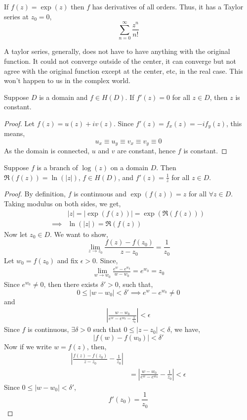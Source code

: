 \documentclass[12pt]{amsart}
\begin{document}
\begin{remark}
    If $f(z) = \exp(z)$ then $f$ has derivatives of all orders. Thus, it has a Taylor series at $z_0 = 0$, 
    \[ \sum_{n=0}^\infty \frac{z^n}{n!} \]
\end{remark}

\begin{remark}
    A taylor series, generally, does not have to have anything with the original function. It could not converge outside of the center, it can converge but not agree with the original function except at the center, etc, in the real case. This won't happen to us in the complex world. 
\end{remark}

\begin{proposition}
    Suppose $D$ is a domain and $f \in H(D)$. If $f'(z) = 0$ for all $z \in D$, then $z$ is constant. 
\end{proposition}
\begin{proof}
    Let $f(z) = u(z) + iv(z)$. Since $f'(z) = f_x(z) = -if_y(z)$, this means, 
    \[ u_x \equiv u_y \equiv v_x \equiv v_y \equiv 0\]
    As the domain is connected, $u$ and $v$ are constant, hence $f$ is constant. 
\end{proof}

\begin{lemma}[2.19]
    Suppose $f$ is a branch of $\log(z)$ on a domain $D$. Then $\Re(f(z)) = \ln(|z|)$, $f \in H(D)$, and $f'(z) = \frac{1}{z}$ for all $z \in D$. 
\end{lemma}
\begin{proof}
    By definition, $f$ is continuous and $\exp(f(z)) = z$ for all $\forall z \in D$. Taking modulus on both sides, we get, 
    \begin{align*}
        &|z| = |\exp(f(z))| = \exp(\Re(f(z))) \\
        \implies & \ln(|z|) = \Re(f(z))
    \end{align*}
    Now let $z_0 \in D$. We want to show, 
    \[ \lim_{z \to z_0} \frac{f(z) - f(z_0)}{z-z_0} = \frac{1}{z_0} \]
    Let $w_0 = f(z_0)$ and fix $\epsilon > 0$. Since, 
    \begin{align*}
        \lim_{w \to w_0} \frac{e^w - e^{w_0}}{w-w_0} = e^{w_0} = z_0
    \end{align*}
    Since $e^{w_0} \neq 0$, then there exists $\delta' > 0$, such that,
    \[ 0 \leq |w-w_0| < \delta' \implies e^w - e^{w_0} \neq 0 \]
    and 
    \begin{align*}
        \left| \frac{w-w_0}{e^w - e^{w_0} - \frac{1}{z_0}}\right| < \epsilon
    \end{align*}
    Since $f$ is continuous, $\exists \delta > 0$ such that $0 \leq |z-z_0| < \delta$, we have,
    \[ |f(w) -f(w_0)| < \delta' \]
    Now if we write $w = f(z)$, then, 
    \begin{align*}
        \left| \frac{f(z)-f(z_0)}{z-z_0} - \frac{1}{z_0}\right| \\
        &= \left| \frac{w-w_0}{e^w-e^{w_0}} - \frac{1}{z_0}\right| < \epsilon
    \end{align*}
    Since $0 \leq |w-w_0| < \delta'$, 
    \[ f'(z_0) = \frac{1}{z_0}\]
\end{proof}
\end{document}
